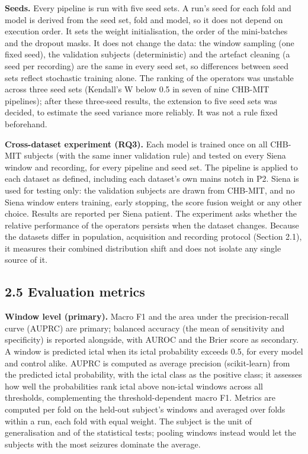 \documentclass[11pt,a4paper]{article}
\begin{document}
\textbf{Seeds.} Every pipeline is run with five seed sets. A run's seed for each fold and
model is derived from the seed set, fold and model, so it
does not depend on execution order. It sets the weight initialisation, the order of
the mini-batches and the dropout masks. It does not change the data: the window
sampling (one fixed seed), the validation subjects (deterministic) and the artefact
cleaning (a seed per recording) are the same in every seed set, so differences between
seed sets reflect stochastic training alone. The ranking of the operators was unstable across
three seed sets (Kendall's W below 0.5 in seven of nine CHB-MIT pipelines); after these
three-seed results, the extension to five seed sets was decided,
to estimate the seed variance more reliably. It was not a rule fixed beforehand.

\textbf{Cross-dataset experiment (RQ3).} Each model is trained once on all CHB-MIT subjects
(with the same inner validation rule) and tested on every Siena window and recording,
for every pipeline and seed set. The pipeline is applied to
each dataset as defined, including each dataset's own mains notch in P2. Siena is
used for testing only: the validation subjects are drawn from CHB-MIT, and no Siena
window enters training, early stopping, the score fusion weight or any other choice.
Results are reported per Siena patient. The experiment asks whether the relative
performance of the operators persists when the dataset changes. Because the datasets
differ in population, acquisition and recording protocol (Section 2.1), it measures
their combined distribution shift and does not isolate any single source of it.

\subsection{2.5 Evaluation metrics}\label{evaluation-metrics}

\textbf{Window level (primary).} Macro F1 and the area under the precision-recall curve
(AUPRC) are primary; balanced accuracy (the mean of sensitivity and specificity) is
reported alongside, with AUROC and the Brier score as secondary. A window is
predicted ictal when its ictal probability exceeds 0.5, for every model and control
alike. AUPRC is computed as average precision (scikit-learn) from the predicted ictal
probability, with the ictal class as the positive class; it assesses how well the
probabilities rank ictal above non-ictal windows across all thresholds, complementing
the threshold-dependent macro F1. Metrics are computed per fold on the held-out
subject's windows and averaged over folds within a run, each fold with equal weight.
The subject is the unit of generalisation and of the statistical tests; pooling
windows instead would let the subjects with the most seizures dominate the average.
\end{document}
